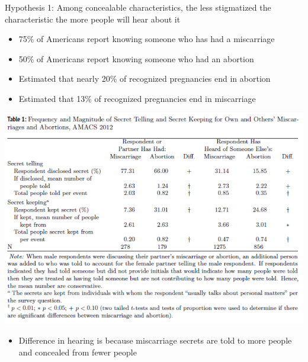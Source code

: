\documentclass[aspectratio=169]{beamer}
\begin{document}
\begin{frame}

Hypothesis 1: Among concealable characteristics, the less stigmatized the characteristic the more people will hear about it \pause

\begin{itemize}
\item 75\% of Americans report knowing someone who has had a miscarriage
\item 50\% of Americans report knowing someone who had an abortion 
\end{itemize}
\pause
\begin{itemize}
\item Estimated that nearly 20\% of recognized pregnancies end in abortion
\item Estimated that 13\% of recognized pregnancies end in miscarriage
\end{itemize}

\end{frame}
\begin{frame}

\begin{center}
\includegraphics[width=1\textwidth]{figures/cowan_secrets_2014_tab1}
\end{center}

\vfill
\begin{itemize}
\item Difference in hearing is because miscarriage secrets are told to more people and concealed from fewer people
\end{itemize}
\end{frame}
\end{document}
